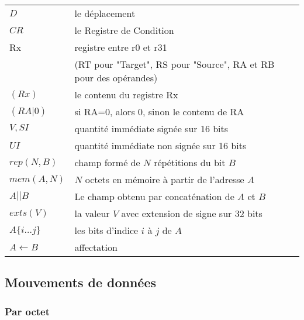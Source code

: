 \documentclass[10pt,twoside,a4paper]{article}
\begin{document}
\begin{tabular}{ll}
$D$ & le déplacement \\
$CR$              & le Registre de Condition \\
Rx              & registre entre r0 et r31 \\
& (RT pour "Target", RS pour "Source", RA et RB pour des opérandes)  \\
$(Rx)$            & le contenu du registre Rx \\
$(RA|0)$          & si RA=0, alors 0, sinon le contenu de RA \\
$V, SI$           & quantité immédiate signée sur 16 bits \\
$UI$              & quantité immédiate non signée sur 16 bits \\
$rep(N,B)$        & champ formé de $N$ répétitions du bit $B$ \\
$mem(A,N)$        & $N$ octets en mémoire à partir de l'adresse $A$ \\
$A || B$          & Le champ obtenu par concaténation de $A$ et $B$ \\
$exts(V)$         & la valeur $V$ avec extension de signe sur 32 bits \\
$A\{i \ldots j\}$         & les bits d'indice $i$ à $j$ de $A$ \\
$A \leftarrow B$          & affectation \\
\end{tabular}


\subsection{Mouvements de données}

\subsubsection{Par octet}
\end{document}
